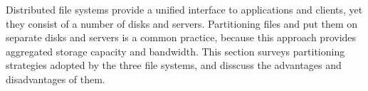 Distributed file systems provide a unified interface to applications and clients,
yet they consist of a number of disks and servers.
%
Partitioning files and put them on separate disks and servers is a common practice,
because this approach provides aggregated storage capacity and bandwidth.
%
This section surveys partitioning strategies adopted by the three file systems,
and disscuss the advantages and disadvantages of them.
